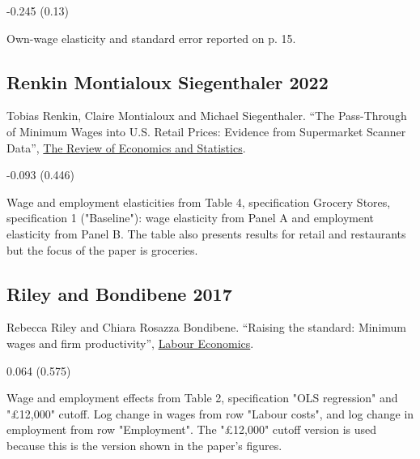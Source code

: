 \vspace{0.7em}

 -0.245 (0.13)

\vspace{0.7em}

 Own-wage elasticity and standard error reported on p. 15.

\subsection*{Renkin Montialoux Siegenthaler 2022}
\vspace{-0.7em}

\noindent Tobias Renkin, Claire Montialoux and Michael Siegenthaler. ``The Pass-Through of Minimum Wages into U.S. Retail Prices: Evidence from Supermarket Scanner Data'', \href{https://doi.org/10.1162/rest_a_00981}{The Review of Economics and Statistics}.

\vspace{0.7em}

 -0.093 (0.446)

\vspace{0.7em}

 Wage and employment elasticities from Table 4, specification Grocery Stores, specification 1 ("Baseline"): wage elasticity from Panel A and employment elasticity from Panel B. The table also presents results for retail and restaurants but the focus of the paper is groceries.

\subsection*{Riley and Bondibene 2017}
\vspace{-0.7em}

\noindent Rebecca Riley and Chiara Rosazza Bondibene. ``Raising the standard: Minimum wages and ﬁrm productivity'', \href{http://dx.doi.org/10.1016/j.labeco.2016.11.010}{Labour Economics}.

\vspace{0.7em}

 0.064 (0.575)

\vspace{0.7em}

 Wage and employment effects from Table 2, specification "OLS regression" and "£12,000" cutoff. Log change in wages from row "Labour costs", and log change in employment from row "Employment". The "£12,000" cutoff version is used because this is the version shown in the paper's figures.

